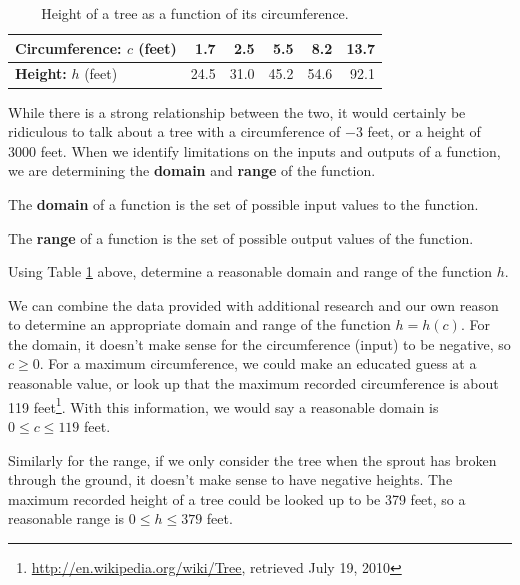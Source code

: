 \begin{table}[ht!]
\begin{centering}
\begin{tabular}{l*{5}{r}}
\toprule
{\bf Circumference:} $c$ (feet) & 1.7 & 2.5 & 5.5 & 8.2 & 13.7\tabularnewline
\midrule
{\bf Height:} $h$ (feet) & 24.5 & 31.0 & 45.2 & 54.6 & 92.1\tabularnewline
\bottomrule
\end{tabular}
\caption{Height of a tree as a function of its circumference.}
\label{tab:1-tree}
\end{centering}
\end{table}
While there is a strong relationship between the two, it would certainly
be ridiculous to talk about a tree with a circumference of $-3$ feet, or a
height of $3000$ feet. When we identify limitations on the inputs and
outputs of a function, we are determining the {\bf domain} and {\bf range} of the function.

\begin{definition}
The {\bf domain} of a function is the set of possible input values to the function.

The {\bf range} of a function is the set of possible output values of the function.
\end{definition}

\begin{example}
Using Table \ref{tab:1-tree} above, determine a reasonable domain and range of the function $h$.

\begin{solution} We can combine the data provided with additional research and our own reason
to determine an appropriate domain and range of the function $h = h(c)$. For
the domain, it doesn't make sense for the circumference (input) to be negative, so $c \ge 0$. For a maximum circumference, we could make an educated guess at a reasonable value, or
look up that the maximum recorded circumference is about 119
feet\footnote{\url{http://en.wikipedia.org/wiki/Tree}, retrieved July
  19, 2010}. With this information, we would say a reasonable domain is $0\le c \le 119$ feet.

Similarly for the range, if we only consider the tree when the sprout has broken through the ground, it doesn't make sense to have negative heights. The maximum recorded height of a tree could be looked up to be 379 feet, so a reasonable range is $0\le h\le 379$ feet.
\end{solution}\end{example}

